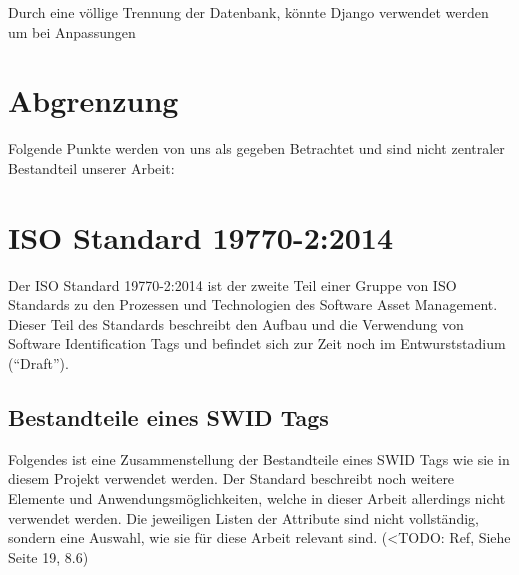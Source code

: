 Durch eine völlige Trennung der Datenbank, könnte Django verwendet werden um bei
Anpassungen

\section{Abgrenzung}
Folgende Punkte werden von uns als gegeben Betrachtet und sind nicht zentraler
Bestandteil unserer Arbeit:

\section{ISO Standard 19770-2:2014} 
Der ISO Standard 19770-2:2014 ist der zweite Teil einer Gruppe von ISO Standards
zu den Prozessen und Technologien des Software Asset Management. Dieser Teil des
Standards beschreibt den Aufbau und die Verwendung von Software Identification
Tags und befindet sich zur Zeit noch im Entwurststadium (\enquote{Draft}).

\subsection{Bestandteile eines SWID Tags}
Folgendes ist eine Zusammenstellung der Bestandteile eines SWID Tags wie sie in
diesem Projekt verwendet werden. Der Standard beschreibt noch weitere Elemente
und Anwendungsmöglichkeiten, welche in dieser Arbeit allerdings nicht verwendet
werden. Die jeweiligen Listen der Attribute sind nicht vollständig, sondern eine
Auswahl, wie sie für diese Arbeit relevant sind. (<TODO: Ref, Siehe Seite 19, 8.6)

